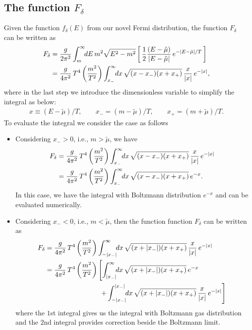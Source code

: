 \documentclass[sn-mathphys,Numbered]{sn-jnl}
\theoremstyle{thmstyleone}%
\theoremstyle{thmstyletwo}%
\theoremstyle{thmstylethree}%
\begin{document}
\subsection{The function $F_\delta$}
Given the function $f_\delta(E)$ from our novel Fermi distribution, the function $F_\delta$ can be written as
\begin{align}
\label{Integral001}
F_\delta&=\frac{g}{2\pi^2}\int^\infty_m\!\!dE\,m^2\sqrt{E^2-m^2} \left[\,\frac{1}{2}\frac{(E-\tilde\mu)}{|E-\tilde\mu|}\,e^{-|E-\tilde\mu|/T}\,\right]\notag\\
&=\frac{g}{4\pi^2}\,T^4\left(\frac{m^2}{T^2}\right)\int^\infty_{x_-}\!\!dx\,\sqrt{(x-x_-)(x+x_+)}\,\frac{x}{|x|}\,e^{-|x|},
\end{align}
where in the last step we introduce the dimensionless variable to simplify the integral as below:
\begin{align}\label{Dimensionless}
x\equiv\left({E-\tilde\mu}\right)/T,\qquad x_-=(m-\tilde\mu)/T,\qquad x_+=(m+\tilde\mu)/T.
\end{align}
To evaluate the integral we consider the case as follows
\begin{itemize}
  \item Considering $x_->0$, i.e., $m>\tilde\mu$, we have
  \begin{align}
 F_\delta&=\frac{g}{4\pi^2}\,T^4\left(\frac{m^2}{T^2}\right)\int^\infty_{x_-}\!\!dx\,\sqrt{(x-x_-)(x+x_+)}\,\frac{x}{|x|}\,e^{-|x|}\notag\\
  &=\frac{g}{4\pi^2}\,T^4\left(\frac{m^2}{T^2}\right)\int^\infty_{x_-}\!\!dx\,\sqrt{(x-x_-)(x+x_+)}\,e^{-x}.
  \end{align}
  In this case, we have the integral with Boltzmann distribution $e^{-x}$ and can be evaluated numerically. 
  \item Considering $x_-<0$, i.e., $m<\tilde\mu$, then the function function $F_\delta$ can be written as
  \begin{align}
  F_\delta&=\frac{g}{4\pi^2}\,T^4\left(\frac{m^2}{T^2}\right)\int^\infty_{-|x_-|}\!\!dx\,\sqrt{(x+|x_-|)(x+x_+)}\,\frac{x}{|x|}\,e^{-|x|}\notag\\
   &=\frac{g}{4\pi^2}\,T^4\left(\frac{m^2}{T^2}\right)\left[\int^\infty_{|x_-|}\!\!dx\,\sqrt{(x+|x_-|)(x+x_+)}\,e^{-x}\right.\notag\\
   &\qquad\qquad\qquad\qquad\left.+\int^{|x_-|}_{-|x_-|}\!\!dx\,\sqrt{(x+|x_-|)(x+x_+)}\,\frac{x}{|x|}\,e^{-|x|}\right]
  \end{align}
  where the $1$st integral gives us the integral with Boltzmann gas distribution and the $2$nd integral provides correction beside the Boltzmann limit.
\end{itemize}
\end{document}
